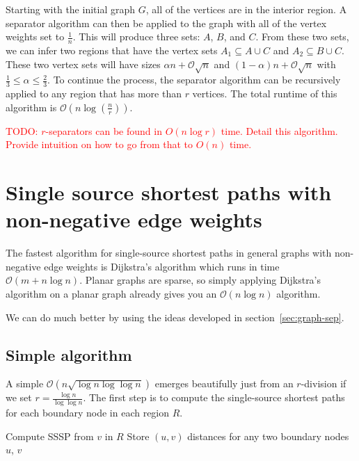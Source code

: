 \documentclass[12pt]{article}
\begin{document}
    Starting with the initial graph $G$, all of the vertices are in the interior region. A separator algorithm can then be applied to the graph with all of the vertex weights set to $\frac{1}{n}$. This will produce three sets: $A$, $B$, and $C$. From these two sets, we can infer two regions that have the vertex sets $A_1 \subseteq A \cup C$ and $A_2 \subseteq B \cup C$. These two vertex sets will have sizes $\alpha n + \mathcal{O}\sqrt{n}$ and $(1 - \alpha) n + \mathcal{O}\sqrt{n}$ with $\frac{1}{3} \leq \alpha \leq \frac{2}{3}$. To continue the process, the separator algorithm can be recursively applied to any region that has more than $r$ vertices. The total runtime of this algorithm is $\mathcal{O} \left (n \log \left (\frac{n}{r} \right ) \right )$.

\textcolor{red}{TODO: $r$-separators can be found in $O(n\log r)$ time. Detail this algorithm. Provide intuition on how to go from that to $O(n)$ time.}

\section{Single source shortest paths with non-negative edge weights}
\label{sec:nonn-edge-weights}

The fastest algorithm for single-source shortest paths in general graphs with non-negative edge weights is Dijkstra's algorithm which runs in time $\mathcal{O}(m + n\log n)$. Planar graphs are sparse, so simply applying Dijkstra's algorithm on a planar graph already gives you an $\mathcal{O}(n \log n)$ algorithm.

We can do much better by using the ideas developed in section~\ref{sec:graph-sep}.

\subsection{Simple algorithm}
\label{sec:simple-algorithm}

A simple $\mathcal{O}(n\sqrt{\log n \log \log n})$ emerges beautifully just from an $r$-division if we set $r = \frac{\log n}{\log \log n}$. The first step is to compute the single-source shortest paths for each boundary node in each region $R$.

\begin{algorithm}[!htb]
  \label{alg:sssp-region}
  \begin{algorithmic}
        \State Compute SSSP from $v$ in $R$
        \State Store $(u,v)$ distances for any two boundary nodes $u$, $v$
      \EndFor
    \EndFor
  \end{algorithmic}
\end{algorithm}
\end{document}
